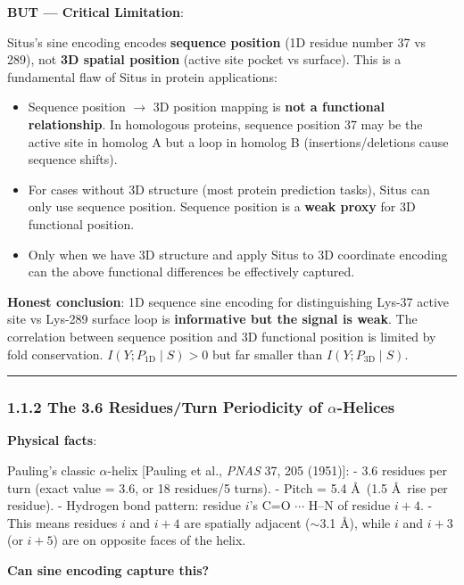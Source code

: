 \documentclass[
  12pt,
]{article}
\providecommand{\tightlist}{%
  \setlength{\itemsep}{0pt}\setlength{\parskip}{0pt}}
\begin{document}
\textbf{BUT --- Critical Limitation}:

Situs's sine encoding encodes \textbf{sequence position} (1D residue number 37 vs 289), not \textbf{3D spatial position} (active site pocket vs surface). This is a fundamental flaw of Situs in protein applications:

\begin{itemize}
\tightlist
\item
  Sequence position $\to$ 3D position mapping is \textbf{not a functional relationship}. In homologous proteins, sequence position 37 may be the active site in homolog A but a loop in homolog B (insertions/deletions cause sequence shifts).
\item
  For cases without 3D structure (most protein prediction tasks), Situs can only use sequence position. Sequence position is a \textbf{weak proxy} for 3D functional position.
\item
  Only when we have 3D structure and apply Situs to 3D coordinate encoding can the above functional differences be effectively captured.
\end{itemize}

\textbf{Honest conclusion}: 1D sequence sine encoding for distinguishing Lys-37 active site vs Lys-289 surface loop is \textbf{informative but the signal is weak}. The correlation between sequence position and 3D functional position is limited by fold conservation. $I(Y; P_{\text{1D}} \mid S) > 0$ but far smaller than $I(Y; P_{\text{3D}} \mid S)$.

\begin{center}\rule{0.5\linewidth}{0.5pt}\end{center}

\subsubsection{1.1.2 The 3.6 Residues/Turn Periodicity of $\alpha$-Helices}\label{alpha-helix-periodicity}

\textbf{Physical facts}:

Pauling's classic $\alpha$-helix [Pauling et al., \emph{PNAS} 37, 205 (1951)]:
- 3.6 residues per turn (exact value = 3.6, or 18 residues/5 turns).
- Pitch = 5.4 \AA\ (1.5 \AA\ rise per residue).
- Hydrogen bond pattern: residue $i$'s C=O $\cdots$ H--N of residue $i+4$.
- This means residues $i$ and $i+4$ are spatially adjacent ($\sim$3.1 \AA), while $i$ and $i+3$ (or $i+5$) are on opposite faces of the helix.

\textbf{Can sine encoding capture this?}
\end{document}
